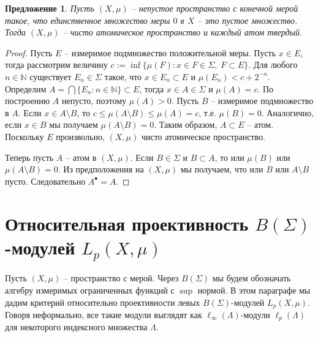 \documentclass[12pt]{article}
\newtheorem{proposition}[theorem]{Предложение}
\begin{document}
\begin{proposition}\label{GenniunelyAtomicMeasCharac} Пусть $(X,\mu)$ -- непустое пространство с конечной мерой такое, что единственное множество меры $0$ в $X$ -- это пустое множество. Тогда $(X,\mu)$ -- чисто атомическое пространство и каждый атом твердый.
\end{proposition}
\begin{proof} Пусть $E$ -- измеримое подмножество положительной меры. Пусть $x\in E$, тогда рассмотрим величину $c:=\inf\{\mu(F):x\in F\in \Sigma,\; F\subset E\}$. Для любого $n\in\mathbb{N}$ существует $E_n\in\Sigma$ такое, что $x\in E_n\subset E$ и $\mu(E_n)<c+2^{-n}$. Определим $A=\bigcap\{E_n:n\in\mathbb{N}\}\subset E$, тогда $x\in A\in\Sigma$ и $\mu(A)=c$. По построению $A$ непусто, поэтому $\mu(A)>0$. Пусть $B$ -- измеримое подмножество в $A$. Если $x\in A\setminus B$, то $c\leq\mu(A\setminus B)\leq\mu(A)=c$, т.е. $\mu(B)=0$. Аналогично, если $x\in B$ мы получаем $\mu(A\setminus B)=0$. Таким образом, $A\subset E$ -- атом. Поскольку $E$ произвольно, $(X,\mu)$ чисто атомическое пространство.

    Теперь пусть $A$ -- атом в $(X,\mu)$. Если $B\in\Sigma$ и $B\subset A$, то или $\mu(B)$ или $\mu(A\setminus B)=0$. Из предположения на $(X,\mu)$ мы получаем, что или $B$ или $A\setminus B$ пусто. Следовательно $A^\bullet=A$.
\end{proof}


\section{Относительная проективность \texorpdfstring{$B(\Sigma)$}{BSigma}-модулей \texorpdfstring{$L_p(X,\mu)$}{LpXmu}}
\label{SectionRelativeProjectivityOfBSigmaModulesLpXmu}

Пусть $(X,\mu)$ -- пространство с мерой. Через $B(\Sigma)$ мы будем обозначать алгебру измеримых ограниченных функций с $\sup$ нормой. В этом параграфе мы дадим критерий относительно проективности левых $B(\Sigma)$-модулей $L_p(X,\mu)$. Говоря неформально, все такие модули выглядят как $\ell_\infty(\Lambda)$-модули $\ell_p(\Lambda)$ для некоторого индексного множества $\Lambda$.
\end{document}
